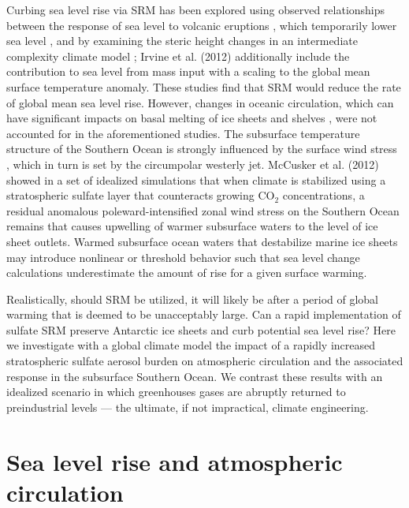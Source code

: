 \documentclass{nature}
\begin{document}
Curbing sea level rise via SRM has been explored using observed relationships between the response of sea level to volcanic eruptions \cite{moore10}, which temporarily lower sea level \cite{church05,gleckler06}, and by examining the steric height changes in an intermediate complexity climate model \cite{irvine12}; Irvine et al. (2012) additionally include the contribution to sea level from mass input with a scaling to the global mean surface temperature anomaly. These studies find that SRM would reduce the rate of global mean sea level rise. However, changes in oceanic circulation, which can have significant impacts on basal melting of ice sheets and shelves \cite{steig13,joughin11,thoma08}, were not accounted for in the aforementioned studies. The subsurface temperature structure of the Southern Ocean is strongly influenced by the surface wind stress \cite{fyfe07}, which in turn is set by the circumpolar westerly jet. McCusker et al. (2012) showed in a set of idealized simulations that when climate is stabilized using a stratospheric sulfate layer that counteracts growing CO$_2$ concentrations, a residual anomalous poleward-intensified zonal wind stress on the Southern Ocean remains that causes upwelling of warmer subsurface waters to the level of ice sheet outlets. Warmed subsurface ocean waters that destabilize marine ice sheets may introduce nonlinear or threshold behavior \cite{notz09} such that sea level change calculations underestimate the amount of rise for a given surface warming.

Realistically, should SRM be utilized, it will likely be after a period of global warming that is deemed to be unacceptably large. Can a rapid implementation of sulfate SRM preserve Antarctic ice sheets and curb potential sea level rise? Here we investigate with a global climate model the impact of a rapidly increased stratospheric sulfate aerosol burden on atmospheric circulation and the associated response in the subsurface Southern Ocean. We contrast these results with an idealized scenario in which greenhouses gases are abruptly returned to preindustrial levels --- the ultimate, if not impractical, climate engineering. %

\section{Sea level rise and atmospheric circulation}
\end{document}
